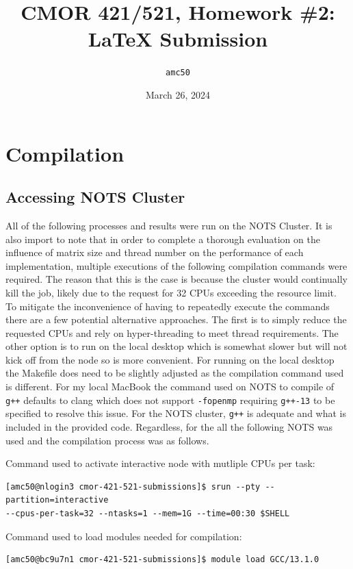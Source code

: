 \documentclass{article}
\title{CMOR 421/521, Homework \#2: \LaTeX{} Submission}
\author{\texttt{amc50}}
\date{March 26, 2024}
\begin{document}
\maketitle

\section{Compilation}
\subsection{Accessing NOTS Cluster}
All of the following processes and results were run on the NOTS Cluster. It is also import to note that in order to complete a thorough evaluation on the influence of matrix size and thread number on the performance of each implementation, multiple executions of the following compilation commands were required. The reason that this is the case is because the cluster would continually kill the job, likely due to the request for 32 CPUs exceeding the resource limit. To mitigate the inconvenience of having to repeatedly execute the commands there are a few potential alternative approaches. The first is to simply reduce the requested CPUs and rely on hyper-threading to meet thread requirements. The other option is to run on the local desktop which is somewhat slower but will not kick off from the node so is more convenient. For running on the local desktop the Makefile does need to be slightly adjusted as the compilation command used is different. For my local MacBook the command used on NOTS to compile of \texttt{g++} defaults to clang which does not support \texttt{-fopenmp} requiring \texttt{g++-13} to be specified to resolve this issue. For the NOTS cluster, \texttt{g++} is adequate and what is included in the provided code. Regardless, for the all the following NOTS was used and the compilation process was as follows. 

\bigskip
\noindent 
Command used to activate interactive node with mutliple CPUs per task:

\begin{verbatim}
[amc50@nlogin3 cmor-421-521-submissions]$ srun --pty --partition=interactive 
--cpus-per-task=32 --ntasks=1 --mem=1G --time=00:30 $SHELL
\end{verbatim}

\bigskip
\noindent 
Command used to load modules needed for compilation:
\begin{verbatim}
[amc50@bc9u7n1 cmor-421-521-submissions]$ module load GCC/13.1.0
\end{verbatim}
\end{document}
